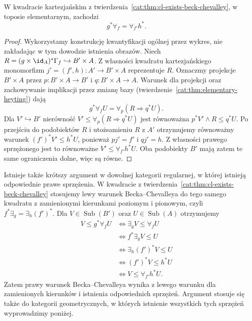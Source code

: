 \begin{twierdzenie}\label{cat:thm:cl-forall-beck-chevalley}
W kwadracie kartezjańskim z twierdzenia~\ref{cat:thm:cl-exists-beck-chevalley}, w toposie elementarnym, zachodzi
\[
 g^*\forall_f=\forall_{f'}h^*.
\]
\end{twierdzenie}
\begin{proof}
Wykorzystamy konstrukcję kwantyfikacji ogólnej przez wykres, nie zakładając w tym dowodzie istnienia obrazów. Niech $R=(g\times\id_A)^*\Gamma_f\hookrightarrow B'\times A$. Z własności kwadratu kartezjańskiego monomorfizm $j'=(f',h):A'\to B'\times A$ reprezentuje $R$. Oznaczmy projekcje $B'\times A$ przez $p:B'\times A\to B'$ i $q:B'\times A\to A$. Warunek dla projekcji oraz zachowywanie implikacji przez zmianę bazy (twierdzenie~\ref{cat:thm:elementary-heyting}) dają
\[
 g^*\forall_f U
 =\forall_p(R\Rightarrow q^*U).
\]
Dla $V'\hookrightarrow B'$ nierówność $V'\leq\forall_p(R\Rightarrow q^*U)$ jest równoważna $p^*V'\wedge R\leq q^*U$. Po przejściu do podobiektów $R$ i utożsamieniu $R$ z $A'$ otrzymujemy równoważny warunek $(f')^*V'\leq h^*U$, ponieważ $pj'=f'$ i $qj'=h$. Z własności prawego sprzężonego jest to równoważne $V'\leq\forall_{f'}h^*U$. Oba podobiekty $B'$ mają zatem te same ograniczenia dolne, więc są równe.
\end{proof}

Istnieje także krótszy argument w dowolnej kategorii regularnej, w której istnieją odpowiednie prawe sprzężenia. W kwadracie z twierdzenia~\ref{cat:thm:cl-exists-beck-chevalley} stosujemy lewy warunek Becka--Chevalleya do tego samego kwadratu z zamienionymi kierunkami poziomym i pionowym, czyli $f^*\exists_g=\exists_h(f')^*$. Dla $V\in\operatorname{Sub}(B')$ oraz $U\in\operatorname{Sub}(A)$ otrzymujemy
\[
\begin{aligned}
 V\leq g^*\forall_f U
 &\iff\exists_g V\leq\forall_f U\\
 &\iff f^*\exists_g V\leq U\\
 &\iff \exists_h(f')^*V\leq U\\
 &\iff (f')^*V\leq h^*U\\
 &\iff V\leq\forall_{f'}h^*U.
\end{aligned}
\]
Zatem prawy warunek Becka--Chevalleya wynika z lewego warunku dla zamienionych kierunków i istnienia odpowiednich sprzężeń. Argument stosuje się także do kategorii geometrycznych, w których istnienie wszystkich tych sprzężeń wyprowadzimy poniżej.


